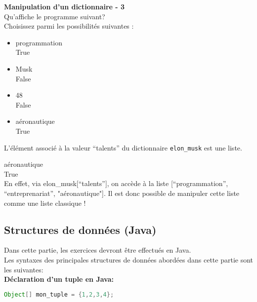     \begin{Exercice}[5 minutes] \textbf{Manipulation d'un dictionnaire - 3}\\
      	Qu'affiche le programme suivant? \\
       
      	 
      	
      	Choisissez parmi les possibilités suivantes : \\
      	
      	\begin{itemize}
      	\item programmation \\
      	True\\
      	\item Musk \\
      	False\\
      	\item 48 \\
      	False\\
      	\item aéronautique \\
      	True \\
      	\end{itemize}
    
        \begin{conseil}
            L'élément associé à la valeur ``talents'' du dictionnaire \lstinline{elon_musk} est une liste.
        \end{conseil}
        
        \begin{solution}
            aéronautique \\
            True \\
            
            En effet, via elon\_musk[``talents''], on accède à la liste [``programmation'', ``entreprenariat'', "aéronautique"]. Il est donc possible de manipuler cette liste comme une liste classique !
        \end{solution}
    \end{Exercice}
    
    \subsection{Structures de données (Java)}
    Dans cette partie, les exercices devront être effectués en Java. \\
    Les syntaxes des principales structures de données abordées dans cette partie sont les suivantes: \\
    \textbf{Déclaration d'un tuple en Java:}
     \begin{lstlisting}[language=Java]
              Object[] mon_tuple = {1,2,3,4}; \end{lstlisting} 
              

